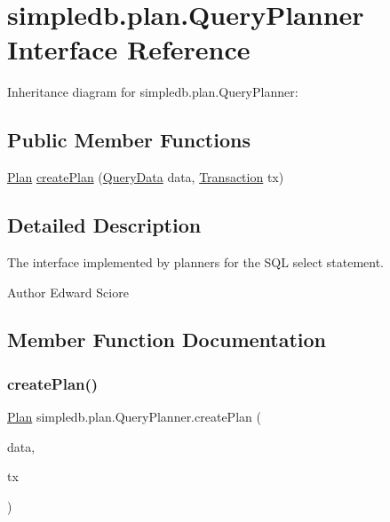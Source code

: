 \hypertarget{interfacesimpledb_1_1plan_1_1QueryPlanner}{}\section{simpledb.\+plan.\+Query\+Planner Interface Reference}
\label{interfacesimpledb_1_1plan_1_1QueryPlanner}


Inheritance diagram for simpledb.\+plan.\+Query\+Planner\+:
\subsection*{Public Member Functions}
\begin{DoxyCompactItemize}
\item 
\hyperlink{interfacesimpledb_1_1plan_1_1Plan}{Plan} \hyperlink{interfacesimpledb_1_1plan_1_1QueryPlanner_a3fcc576e66a155bdc11845ec3e95838f}{create\+Plan} (\hyperlink{classsimpledb_1_1parse_1_1QueryData}{Query\+Data} data, \hyperlink{classsimpledb_1_1tx_1_1Transaction}{Transaction} tx)
\end{DoxyCompactItemize}


\subsection{Detailed Description}
The interface implemented by planners for the S\+QL select statement. \begin{DoxyAuthor}{Author}
Edward Sciore 
\end{DoxyAuthor}


\subsection{Member Function Documentation}
\mbox{\label{interfacesimpledb_1_1plan_1_1QueryPlanner_a3fcc576e66a155bdc11845ec3e95838f}} 
\subsubsection{\texorpdfstring{create\+Plan()}{createPlan()}}
{\footnotesize\ttfamily \hyperlink{interfacesimpledb_1_1plan_1_1Plan}{Plan} simpledb.\+plan.\+Query\+Planner.\+create\+Plan (\begin{DoxyParamCaption}\item[{\hyperlink{classsimpledb_1_1parse_1_1QueryData}{Query\+Data}}]{data,  }\item[{\hyperlink{classsimpledb_1_1tx_1_1Transaction}{Transaction}}]{tx }\end{DoxyParamCaption})}

